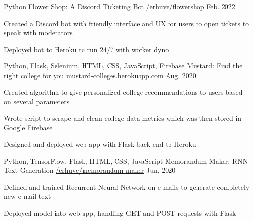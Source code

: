 

\begin{cventries}

  \cventry
    {Python} %
    {Flower Shop: A Discord Ticketing Bot} %
    {\href{https://github.com/erhuve/flowershop}{/erhuve/flowershop}} %
    {Feb. 2022} %
    {
      \begin{cvitems} %
        \item {Created a Discord bot with friendly interface and UX for users to open tickets to speak with moderators}
        \item {Deployed bot to Heroku to run 24/7 with worker dyno}
      \end{cvitems}
    }

  \cventry
    {Python, Flask, Selenium, HTML, CSS, JavaScript, Firebase} %
    {Mustard: Find the right college for you} %
    {\href{http://mustard-colleges.herokuapp.com/}{mustard-colleges.herokuapp.com}} %
    {Aug. 2020} %
    {
      \begin{cvitems} %
        \item {Created algorithm to give personalized college recommendations to users based on several parameters}
        \item {Wrote script to scrape and clean college data metrics which was then stored in Google Firebase}
        \item {Designed and deployed web app with Flask back-end to Heroku}
      \end{cvitems}
    }

  \cventry
    {Python, TensorFlow, Flask, HTML, CSS, JavaScript} %
    {Memorandum Maker: RNN Text Generation} %
    {\href{https://github.com/erhuve/memorandum-maker}{/erhuve/memorandum-maker}} %
    {Jun. 2020} %
    {
      \begin{cvitems} %
        \item {Defined and trained Recurrent Neural Network on e-mails to generate completely new e-mail text}
        \item {Deployed model into web app, handling GET and POST requests with Flask}
      \end{cvitems}
    }
\end{cventries}

